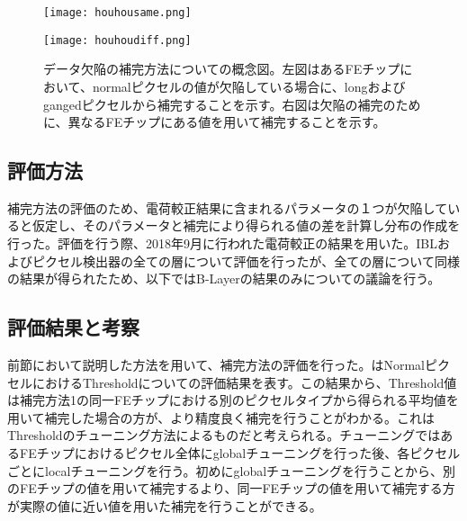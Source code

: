 \begin{figure}[tbp]
  \begin{minipage}[b]{0.45\linewidth}
    \centering
    \texttt{[image: houhousame.png]}
  \end{minipage}
  \begin{minipage}[b]{0.55\linewidth}
    \centering
    \texttt{[image: houhoudiff.png]}
  \end{minipage}
  \caption[データ欠陥の補完方法]{データ欠陥の補完方法についての概念図。左図はあるFEチップにおいて、normalピクセルの値が欠陥している場合に、longおよびgangedピクセルから補完することを示す。右図は欠陥の補完のために、異なるFEチップにある値を用いて補完することを示す。}
  \label{fig:houhouhou}
\end{figure}


\subsection{評価方法}
補完方法の評価のため、電荷較正結果に含まれるパラメータの１つが欠陥していると仮定し、そのパラメータと補完により得られる値の差を計算し分布の作成を行った。評価を行う際、2018年9月に行われた電荷較正の結果を用いた。IBLおよびピクセル検出器の全ての層について評価を行ったが、全ての層について同様の結果が得られたため、以下ではB-Layerの結果のみについての議論を行う。

\subsection{評価結果と考察}

前節において説明した方法を用いて、補完方法の評価を行った。はNormalピクセルにおけるThresholdについての評価結果を表す。この結果から、Threshold値は補完方法1の同一FEチップにおける別のピクセルタイプから得られる平均値を用いて補完した場合の方が、より精度良く補完を行うことがわかる。これはThresholdのチューニング方法によるものだと考えられる。チューニングではあるFEチップにおけるピクセル全体にglobalチューニングを行った後、各ピクセルごとにlocalチューニングを行う。初めにglobalチューニングを行うことから、別のFEチップの値を用いて補完するより、同一FEチップの値を用いて補完する方が実際の値に近い値を用いた補完を行うことができる。

